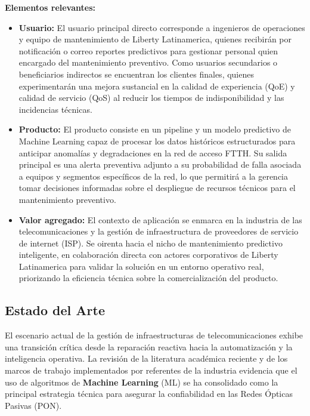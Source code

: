 \documentclass[12pt,a4paper]{article}
\begin{document}
    \noindent
    \textbf{Elementos relevantes:}
    \begin{itemize}
        \item \textbf{Usuario:} El usuario principal directo corresponde a ingenieros de operaciones y equipo de mantenimiento de Liberty Latinamerica, quienes recibirán por notificación o correo reportes
        predictivos para gestionar personal quien encargado del mantenimiento preventivo. Como usuarios secundarios o beneficiarios indirectos se encuentran los clientes finales, quienes experimentarán una mejora sustancial en la calidad de experiencia (QoE)
        y calidad de servicio (QoS) al reducir los tiempos de indisponibilidad y las incidencias técnicas.
        \item \textbf{Producto:} El producto consiste en un pipeline y un modelo predictivo de Machine Learning capaz de procesar los datos históricos estructurados para anticipar anomalías y degradaciones en la red de acceso FTTH. Su salida
        principal es una alerta preventiva adjunto a su probabilidad de falla asociada a equipos y segmentos específicos de la red, lo que permitirá a la gerencia tomar decisiones informadas sobre el despliegue de recursos técnicos para el mantenimiento preventivo.
        \item \textbf{Valor agregado:} El contexto de aplicación se enmarca en la industria de las telecomunicaciones y la gestión de infraestructura de proveedores de servicio de internet (ISP). Se oirenta hacia el nicho de mantenimiento predictivo
        inteligente, en colaboración directa con actores corporativos de Liberty Latinamerica para validar la solución en un entorno operativo real, priorizando la eficiencia técnica sobre la comercialización del producto. 
    \end{itemize}


    \newpage
\subsection{Estado del Arte}
\noindent
El escenario actual de la gestión de infraestructuras de telecomunicaciones exhibe una transición crítica desde la reparación reactiva hacia la automatización y la inteligencia operativa. La revisión de la literatura académica reciente y de los marcos de trabajo implementados por referentes de la industria evidencia que el uso de algoritmos 
de \textbf{Machine Learning} (ML) se ha consolidado como la principal estrategia técnica para asegurar la confiabilidad en las Redes Ópticas Pasivas (PON).
\end{document}
